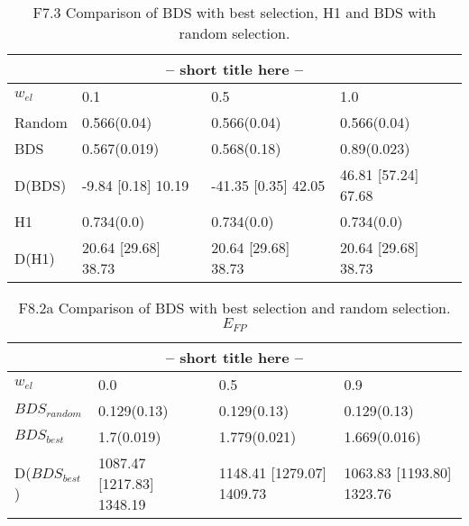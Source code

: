\clearpage
\begin{landscape}
\begin{table}[h]
\label{at:xx}
\begin{center}
\begin{tabular}{llll}
\toprule
\multicolumn{4}{c}{-- short title here --}\\
\midrule
$w_{el}$ & 0.1 & 0.5 & 1.0\\
\midrule
Random & 0.566(0.04) & 0.566(0.04) & 0.566(0.04)\\
\midrule
BDS & 0.567(0.019) & 0.568(0.18) & 0.89(0.023)\\
D(BDS) & -9.84 [0.18] 10.19 & -41.35 [0.35] 42.05 & 46.81 [57.24] 67.68\\
H1 & 0.734(0.0) & 0.734(0.0) & 0.734(0.0)\\
D(H1) & 20.64 [29.68] 38.73 & 20.64 [29.68] 38.73 & 20.64 [29.68] 38.73\\
\bottomrule
\end{tabular}
\end{center}
\caption{F7.3 Comparison of BDS with best selection, H1 and BDS with random selection. }
\end{table}
\end{landscape}


\clearpage
\begin{landscape}
\begin{table}[h]
\label{at:xx}
\begin{center}
\begin{tabular}{llll}
\toprule
\multicolumn{4}{c}{-- short title here --}\\
\midrule
$w_{el}$ & 0.0 & 0.5 & 0.9\\
\midrule
$BDS_{random}$ & 0.129(0.13) & 0.129(0.13) & 0.129(0.13)\\
\midrule
$BDS_{best}$ & 1.7(0.019) & 1.779(0.021) & 1.669(0.016)\\
D($BDS_{best}$) & 1087.47 [1217.83] 1348.19 & 1148.41 [1279.07] 1409.73 & 1063.83 [1193.80] 1323.76\\
\bottomrule
\end{tabular}
\end{center}
\caption{F8.2a Comparison of BDS with best selection and random selection. $E_{FP}$}
\end{table}
\end{landscape}


